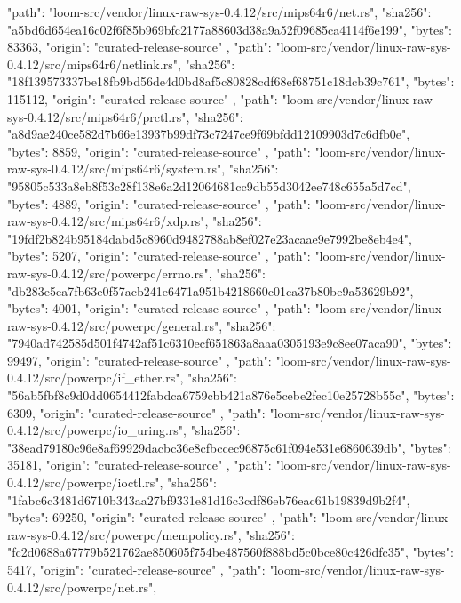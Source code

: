 {{      "path": "loom-src/vendor/linux-raw-sys-0.4.12/src/mips64r6/net.rs",
      "sha256": "a5bd6d654ea16c02f6f85b969bfc2177a88603d38a9a52f09685ca4114f6e199",
      "bytes": 83363,
      "origin": "curated-release-source"
    },
    {
      "path": "loom-src/vendor/linux-raw-sys-0.4.12/src/mips64r6/netlink.rs",
      "sha256": "18f139573337be18fb9bd56de4d0bd8af5c80828cdf68ef68751c18dcb39c761",
      "bytes": 115112,
      "origin": "curated-release-source"
    },
    {
      "path": "loom-src/vendor/linux-raw-sys-0.4.12/src/mips64r6/prctl.rs",
      "sha256": "a8d9ae240ce582d7b66e13937b99df73c7247ce9f69bfdd12109903d7c6dfb0e",
      "bytes": 8859,
      "origin": "curated-release-source"
    },
    {
      "path": "loom-src/vendor/linux-raw-sys-0.4.12/src/mips64r6/system.rs",
      "sha256": "95805c533a8eb8f53c28f138e6a2d12064681cc9db55d3042ee748c655a5d7cd",
      "bytes": 4889,
      "origin": "curated-release-source"
    },
    {
      "path": "loom-src/vendor/linux-raw-sys-0.4.12/src/mips64r6/xdp.rs",
      "sha256": "19fdf2b824b95184dabd5c8960d9482788ab8ef027e23acaae9e7992be8eb4e4",
      "bytes": 5207,
      "origin": "curated-release-source"
    },
    {
      "path": "loom-src/vendor/linux-raw-sys-0.4.12/src/powerpc/errno.rs",
      "sha256": "db283e5ea7fb63e0f57acb241e6471a951b4218660c01ca37b80be9a53629b92",
      "bytes": 4001,
      "origin": "curated-release-source"
    },
    {
      "path": "loom-src/vendor/linux-raw-sys-0.4.12/src/powerpc/general.rs",
      "sha256": "7940ad742585d501f4742af51c6310ecf651863a8aaa0305193e9c8ee07aca90",
      "bytes": 99497,
      "origin": "curated-release-source"
    },
    {
      "path": "loom-src/vendor/linux-raw-sys-0.4.12/src/powerpc/if_ether.rs",
      "sha256": "56ab5fbf8c9d0dd0654412fabdca6759cbb421a876e5cebe2fec10e25728b55c",
      "bytes": 6309,
      "origin": "curated-release-source"
    },
    {
      "path": "loom-src/vendor/linux-raw-sys-0.4.12/src/powerpc/io_uring.rs",
      "sha256": "38ead79180c96e8af69929dacbc36e8cfbccec96875c61f094e531e6860639db",
      "bytes": 35181,
      "origin": "curated-release-source"
    },
    {
      "path": "loom-src/vendor/linux-raw-sys-0.4.12/src/powerpc/ioctl.rs",
      "sha256": "1fabc6c3481d6710b343aa27bf9331e81d16c3cdf86eb76eac61b19839d9b2f4",
      "bytes": 69250,
      "origin": "curated-release-source"
    },
    {
      "path": "loom-src/vendor/linux-raw-sys-0.4.12/src/powerpc/mempolicy.rs",
      "sha256": "fc2d0688a67779b521762ae850605f754be487560f888bd5c0bce80c426dfc35",
      "bytes": 5417,
      "origin": "curated-release-source"
    },
    {
      "path": "loom-src/vendor/linux-raw-sys-0.4.12/src/powerpc/net.rs",
}}
